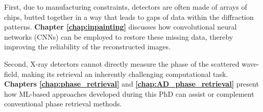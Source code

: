 First, due to manufacturing constraints, detectors are often made of arrays of chips, butted together in a way that 
leads to gaps of data within the diffraction patterns. \textbf{Chapter \ref{chap:inpainting}} discusses how convolutional neural networks 
(CNNs) can be employed to restore these missing data, thereby improving the reliability of the reconstructed images.

Second, X-ray detectors cannot directly measure the phase of the scattered wave-field, making its retrieval an inherently 
challenging computational task. \textbf{Chapters \ref{chap:phase_retrieval}} and \textbf{\ref{chap:AD_phase_retrieval}} 
present how ML-based approaches developed during this PhD can assist or complement conventional phase retrieval methods. 
